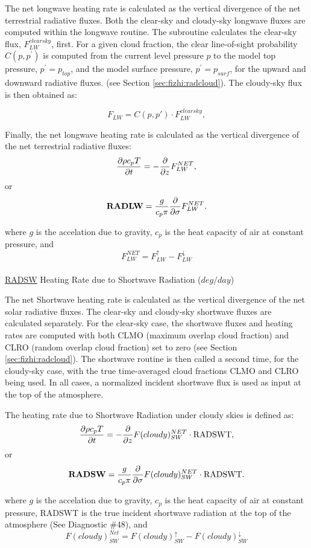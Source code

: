 \noindent
The net longwave heating rate is calculated as the vertical divergence of the
net terrestrial radiative fluxes.
Both the clear-sky and cloudy-sky longwave fluxes are computed within the
longwave routine.
The subroutine calculates the clear-sky flux, $F^{clearsky}_{LW}$, first.
For a given cloud fraction,
the clear line-of-sight probability $C(p,p^{\prime})$ is computed from the current level pressure $p$ 
to the model top pressure, $p^{\prime} = p_{top}$, and the model surface pressure, $p^{\prime} = p_{surf}$,
for the upward and downward radiative fluxes.
(see Section \ref{sec:fizhi:radcloud}).
The cloudy-sky flux is then obtained as:
   
\noindent
\[
F_{LW} = C(p,p') \cdot F^{clearsky}_{LW},
\]

\noindent
Finally, the net longwave heating rate is calculated as the vertical divergence of the
net terrestrial radiative fluxes:
\[
\frac{\partial \rho c_p T}{\partial t} = - \frac{\partial }{\partial z} F_{LW}^{NET} ,
\]
or
\[
{\bf RADLW} = \frac{g}{c_p \pi} \frac{\partial }{\partial \sigma} F_{LW}^{NET} .
\]

\noindent
where $g$ is the accelation due to gravity,
$c_p$ is the heat capacity of air at constant pressure,
and
\[
F_{LW}^{NET} = F_{LW}^\uparrow - F_{LW}^\downarrow
\]
\\


\noindent
{ \underline {RADSW} Heating Rate due to Shortwave Radiation ($deg/day$) }

\noindent
The net Shortwave heating rate is calculated as the vertical divergence of the
net solar radiative fluxes.
The clear-sky and cloudy-sky shortwave fluxes are calculated separately.
For the clear-sky case, the shortwave fluxes and heating rates are computed with
both CLMO (maximum overlap cloud fraction) and
CLRO (random overlap cloud fraction) set to zero (see Section \ref{sec:fizhi:radcloud}).
The shortwave routine is then called a second time, for the cloudy-sky case, with the
true time-averaged cloud fractions CLMO
and CLRO being used.  In all cases, a normalized incident shortwave flux is used as
input at the top of the atmosphere.

\noindent
The heating rate due to Shortwave Radiation under cloudy skies is defined as:
\[
\frac{\partial \rho c_p T}{\partial t} = - \frac{\partial }{\partial z} F(cloudy)_{SW}^{NET} \cdot {\rm RADSWT},
\]
or
\[
{\bf RADSW} = \frac{g}{c_p \pi} \frac{\partial }{\partial \sigma} F(cloudy)_{SW}^{NET}\cdot {\rm RADSWT} .
\]

\noindent
where $g$ is the accelation due to gravity,
$c_p$ is the heat capacity of air at constant pressure, RADSWT is the true incident
shortwave radiation at the top of the atmosphere (See Diagnostic \#48), and
\[
F(cloudy)_{SW}^{Net} = F(cloudy)_{SW}^\uparrow - F(cloudy)_{SW}^\downarrow
\]
\\

